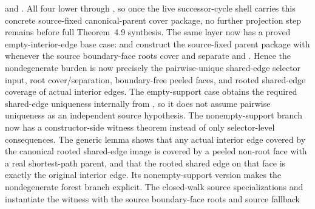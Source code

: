 \documentclass[11pt]{article}
\begin{document}
\begin{itemize}
and
.
All four lower through
,
so once the live successor-cycle shell carries this concrete source-fixed
canonical-parent cover package, no further projection step remains before full
Theorem~4.9 synthesis.  The same layer
now has a proved empty-interior-edge base case:
and
construct the source-fixed parent package with 
whenever the source boundary-face roots cover and separate and
.  Hence the nondegenerate burden is
now precisely the pairwise-unique shared-edge selector input, root
cover/separation, boundary-free peeled faces, and rooted shared-edge coverage
of actual interior edges.  The empty-support case obtains the required shared-edge
uniqueness internally from
, so it
does not assume pairwise uniqueness as an independent source hypothesis.
The nonempty-support branch now has a constructor-side witness theorem instead
of only selector-level consequences.  The generic lemma
shows that any actual interior edge covered by the canonical rooted shared-edge
image is covered by a peeled non-root face with a real shortest-path parent,
and that the rooted shared edge on that face is exactly the original interior
edge.  Its nonempty-support version
makes the nondegenerate forest branch explicit.  The closed-walk source
specializations
and
instantiate the witness with the source boundary-face roots and source fallback

\end{itemize}
\end{document}
